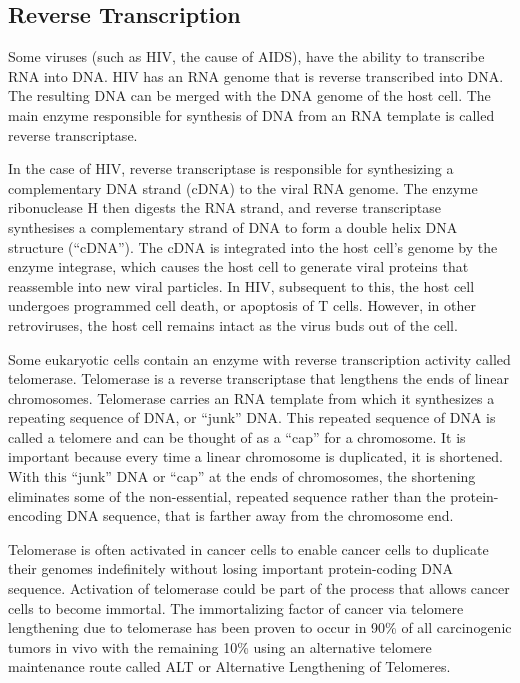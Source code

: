 \hypertarget{reverse-transcription}{%
\subsection{Reverse Transcription}\label{reverse-transcription}}

Some viruses (such as HIV, the cause of AIDS), have the ability to transcribe RNA into DNA. HIV has an RNA genome that is reverse transcribed into DNA. The resulting DNA can be merged with the DNA genome of the host cell. The main enzyme responsible for synthesis of DNA from an RNA template is called reverse transcriptase.

In the case of HIV, reverse transcriptase is responsible for synthesizing a complementary DNA strand (cDNA) to the viral RNA genome. The enzyme ribonuclease H then digests the RNA strand, and reverse transcriptase synthesises a complementary strand of DNA to form a double helix DNA structure (``cDNA''). The cDNA is integrated into the host cell's genome by the enzyme integrase, which causes the host cell to generate viral proteins that reassemble into new viral particles. In HIV, subsequent to this, the host cell undergoes programmed cell death, or apoptosis of T cells. However, in other retroviruses, the host cell remains intact as the virus buds out of the cell.

Some eukaryotic cells contain an enzyme with reverse transcription activity called telomerase. Telomerase is a reverse transcriptase that lengthens the ends of linear chromosomes. Telomerase carries an RNA template from which it synthesizes a repeating sequence of DNA, or ``junk'' DNA. This repeated sequence of DNA is called a telomere and can be thought of as a ``cap'' for a chromosome. It is important because every time a linear chromosome is duplicated, it is shortened. With this ``junk'' DNA or ``cap'' at the ends of chromosomes, the shortening eliminates some of the non-essential, repeated sequence rather than the protein-encoding DNA sequence, that is farther away from the chromosome end.

Telomerase is often activated in cancer cells to enable cancer cells to duplicate their genomes indefinitely without losing important protein-coding DNA sequence. Activation of telomerase could be part of the process that allows cancer cells to become immortal. The immortalizing factor of cancer via telomere lengthening due to telomerase has been proven to occur in 90\% of all carcinogenic tumors in vivo with the remaining 10\% using an alternative telomere maintenance route called ALT or Alternative Lengthening of Telomeres.

